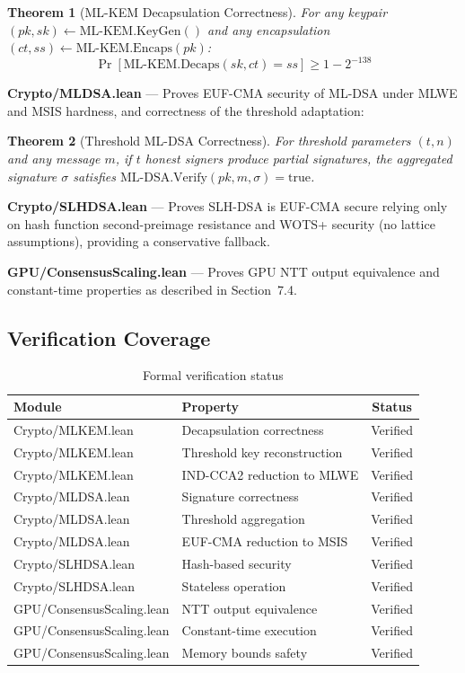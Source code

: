 \documentclass[11pt,letterpaper]{article}
\newtheorem{theorem}{Theorem}
\theoremstyle{definition}
\theoremstyle{remark}
\begin{document}
\begin{theorem}[ML-KEM Decapsulation Correctness]
For any keypair $(pk, sk) \leftarrow \text{ML-KEM.KeyGen}()$ and any encapsulation $(ct, ss) \leftarrow \text{ML-KEM.Encaps}(pk)$:
\[
\Pr[\text{ML-KEM.Decaps}(sk, ct) = ss] \geq 1 - 2^{-138}
\]
\end{theorem}

\textbf{Crypto/MLDSA.lean} --- Proves EUF-CMA security of ML-DSA under MLWE and MSIS hardness, and correctness of the threshold adaptation:

\begin{theorem}[Threshold ML-DSA Correctness]
For threshold parameters $(t, n)$ and any message $m$, if $t$ honest signers produce partial signatures, the aggregated signature $\sigma$ satisfies $\text{ML-DSA.Verify}(pk, m, \sigma) = \text{true}$.
\end{theorem}

\textbf{Crypto/SLHDSA.lean} --- Proves SLH-DSA is EUF-CMA secure relying only on hash function second-preimage resistance and WOTS+ security (no lattice assumptions), providing a conservative fallback.

\textbf{GPU/ConsensusScaling.lean} --- Proves GPU NTT output equivalence and constant-time properties as described in Section~7.4.

\subsection{Verification Coverage}

\begin{table}[h]
\centering
\begin{tabular}{llc}
\toprule
\textbf{Module} & \textbf{Property} & \textbf{Status} \\
\midrule
Crypto/MLKEM.lean & Decapsulation correctness & Verified \\
Crypto/MLKEM.lean & Threshold key reconstruction & Verified \\
Crypto/MLKEM.lean & IND-CCA2 reduction to MLWE & Verified \\
Crypto/MLDSA.lean & Signature correctness & Verified \\
Crypto/MLDSA.lean & Threshold aggregation & Verified \\
Crypto/MLDSA.lean & EUF-CMA reduction to MSIS & Verified \\
Crypto/SLHDSA.lean & Hash-based security & Verified \\
Crypto/SLHDSA.lean & Stateless operation & Verified \\
GPU/ConsensusScaling.lean & NTT output equivalence & Verified \\
GPU/ConsensusScaling.lean & Constant-time execution & Verified \\
GPU/ConsensusScaling.lean & Memory bounds safety & Verified \\
\bottomrule
\end{tabular}
\caption{Formal verification status}
\label{tab:verification}
\end{table}
\end{document}
